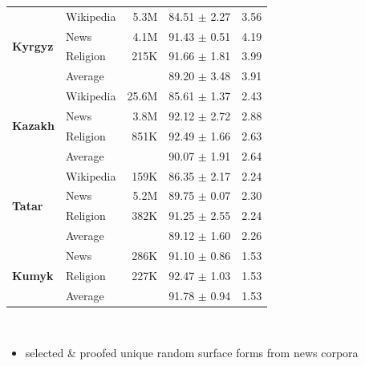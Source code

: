 \documentclass[fontscale=0.3,landscape,paperwidth=72in,paperheight=36in]{baposter}  %
\newcommand{\hiliteone}[1]{{\addfontfeature{Color=06821699}#1}}
\newcommand{\htwo}[1]{{\htwofont \textbf{\dotfill{}#1\dotfill{}}}}
\begin{document}
\begin{poster}
{\begin{center}
{\begin{tabular}{llrrr}
				\multirow{4}{*}{\textbf{Kyrgyz}} & Wikipedia & 5.3M & 84.51 $\pm$ 2.27 & 3.56 \\
					& News & 4.1M & 91.43 $\pm$ 0.51 & 4.19 \\
					& Religion & 215K & 91.66 $\pm$ 1.81 & 3.99 \\\cmidrule{2-5}
				 (r54474) & Average &  & \hiliteone{89.20} $\pm$ 3.48 & 3.91 \\
				\midrule
				\multirow{4}{*}{\textbf{Kazakh}} & Wikipedia & 25.6M & 85.61 $\pm$ 1.37 & 2.43 \\
					& News & 3.8M & 92.12 $\pm$ 2.72  & 2.88 \\
					& Religion & 851K & 92.49 $\pm$ 1.66  & 2.63 \\\cmidrule{2-5}
				 (r50547) & Average &  & \hiliteone{90.07} $\pm$ 1.91  & 2.64\\
				\midrule
				\multirow{4}{*}{\textbf{Tatar}} & Wikipedia & 159K & 86.35 $\pm$ 2.17  & 2.24\\
					& News & 5.2M & 89.75 $\pm$ 0.07  & 2.30 \\
					& Religion & 382K & 91.25 $\pm$ 2.55 & 2.24 \\\cmidrule{2-5}
				 (r50260) & Average &  & \hiliteone{89.12} $\pm$ 1.60 & 2.26 \\
				\midrule
				\multirow{3}{*}{\textbf{Kumyk}} & News & 286K &  91.10 $\pm$ 0.86  & 1.53 \\
					& Religion & 227K & 92.47 $\pm$ 1.03  & 1.53 \\\cmidrule{2-5}
				 (r50300) & Average &  & \hiliteone{91.78} $\pm$ 0.94 & 1.53 \\
				\bottomrule
			\end{tabular}\\
		}
\end{center}


			\vspace{-0.4em}
			\begin{itemize}
				\item {}{\small selected \& proofed unique random surface forms from news corpora}
			\end{itemize}


}
\end{poster}
\end{document}
